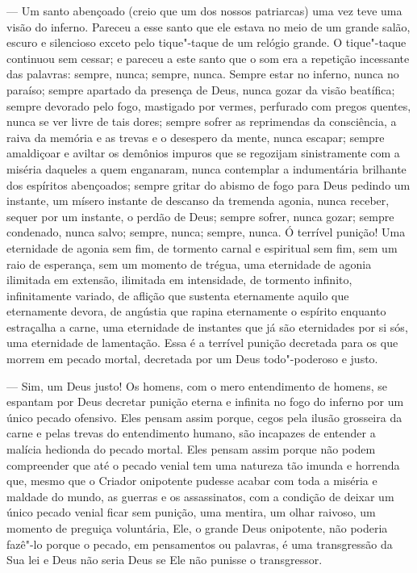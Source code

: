  --- Um santo abençoado (creio que um dos nossos patriarcas) uma vez teve
uma visão do inferno. Pareceu a esse santo que ele estava no meio de um
grande salão, escuro e silencioso exceto pelo tique"-taque de um relógio
grande. O tique"-taque continuou sem cessar; e pareceu a este santo que
o som era a repetição incessante  das palavras: sempre, nunca; sempre,
nunca. Sempre estar no inferno, nunca no paraíso; sempre apartado da
presença de Deus, nunca gozar da visão beatífica; sempre devorado pelo
fogo, mastigado por vermes, perfurado com pregos quentes, nunca se ver
livre de tais dores; sempre sofrer as reprimendas da consciência, a
raiva da memória e as trevas e o desespero da mente, nunca escapar;
sempre amaldiçoar e aviltar os demônios impuros que se regozijam
sinistramente com a miséria daqueles a quem enganaram, nunca contemplar
a indumentária brilhante dos espíritos abençoados; sempre gritar do
abismo de fogo para Deus pedindo um instante, um mísero instante de
descanso da tremenda agonia, nunca receber, sequer por um instante, o
perdão de Deus; sempre sofrer, nunca gozar; sempre condenado, nunca
salvo; sempre, nunca; sempre, nunca. Ó terrível punição! Uma eternidade
de agonia sem fim, de tormento carnal e espiritual sem fim, sem um raio
de esperança, sem um momento de trégua, uma eternidade de agonia
ilimitada em extensão, ilimitada em intensidade, de tormento infinito,
infinitamente variado, de aflição que sustenta eternamente aquilo que
eternamente devora, de angústia que rapina eternamente o espírito
enquanto estraçalha a carne, uma eternidade de instantes que já são
eternidades por si sós, uma eternidade de lamentação. Essa é a terrível
punição decretada para os que morrem em pecado mortal, decretada por um
Deus todo"-poderoso e justo.

 --- Sim, um Deus justo! Os homens, com o mero entendimento de homens, se
espantam por Deus decretar punição eterna e infinita no fogo do inferno
por um único pecado ofensivo. Eles pensam assim porque, cegos pela
ilusão grosseira da carne e pelas trevas do entendimento humano, são
incapazes de entender a malícia hedionda do pecado mortal. Eles pensam
assim porque não podem compreender que até o pecado venial tem uma
natureza tão imunda e horrenda que, mesmo que o Criador onipotente
pudesse acabar com toda a miséria e maldade do mundo, as guerras e os
assassinatos, com a condição de deixar um único pecado venial ficar sem
punição, uma mentira, um olhar raivoso, um momento de preguiça
voluntária, Ele, o grande Deus onipotente, não poderia fazê"-lo porque o
pecado, em pensamentos ou palavras, é uma transgressão da Sua lei e
Deus não seria Deus se Ele não punisse o transgressor.

